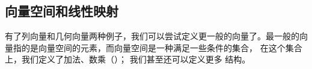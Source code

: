 
\subsection{向量空间和线性映射}

有了列向量和几何向量两种例子，我们可以尝试定义更一般的向量了。最一般的向量指的是向量空间的元素，而向量空间是一种满足一些条件的集合， 在这个集合上，我们定义了加法、数乘（）； 我们甚至还可以定义更多 结构。


